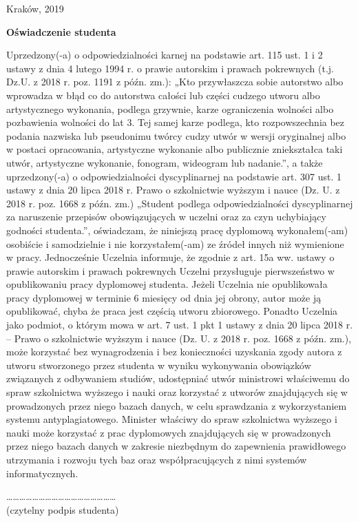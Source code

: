 \documentclass[12pt,a4paper,titlepage]{article}
\begin{document}
\begin{center}
Kraków, 2019
\end{center}
\newpage

\begin{center}
\textbf{Oświadczenie studenta}
\end{center}

Uprzedzony(-a) o odpowiedzialności karnej na podstawie art. 115 ust. 1 i 2 ustawy z dnia
4 lutego 1994 r. o prawie autorskim i prawach pokrewnych (t.j. Dz.U. z 2018 r. poz.
1191 z późn. zm.): „Kto przywłaszcza sobie autorstwo albo wprowadza w błąd co do
autorstwa całości lub części cudzego utworu albo artystycznego wykonania, podlega
grzywnie, karze ograniczenia wolności albo pozbawienia wolności do lat 3. Tej samej
karze podlega, kto rozpowszechnia bez podania nazwiska lub pseudonimu twórcy cudzy
utwór w wersji oryginalnej albo w postaci opracowania, artystyczne wykonanie albo
publicznie zniekształca taki utwór, artystyczne wykonanie, fonogram, wideogram lub
nadanie.”, a także uprzedzony(-a) o odpowiedzialności dyscyplinarnej na podstawie art.
307 ust. 1 ustawy z dnia 20 lipca 2018 r. Prawo o szkolnictwie wyższym i nauce (Dz. U.
z 2018 r. poz. 1668 z późn. zm.) „Student podlega odpowiedzialności dyscyplinarnej za
naruszenie przepisów obowiązujących w uczelni oraz za czyn uchybiający godności
studenta.”, oświadczam, że niniejszą pracę dyplomową wykonałem(-am) osobiście
i samodzielnie i nie korzystałem(-am) ze źródeł innych niż wymienione w pracy.
Jednocześnie Uczelnia informuje, że zgodnie z art. 15a ww. ustawy o prawie autorskim
i prawach pokrewnych Uczelni przysługuje pierwszeństwo w opublikowaniu pracy
dyplomowej studenta. Jeżeli Uczelnia nie opublikowała pracy dyplomowej w terminie
6 miesięcy od dnia jej obrony, autor może ją opublikować, chyba że praca jest częścią
utworu zbiorowego. Ponadto Uczelnia jako podmiot, o którym mowa w art. 7 ust. 1 pkt 1
ustawy z dnia 20 lipca 2018 r. – Prawo o szkolnictwie wyższym i nauce (Dz. U. z 2018 r.
poz. 1668 z późn. zm.), może korzystać bez wynagrodzenia i bez konieczności uzyskania
zgody autora z utworu stworzonego przez studenta w wyniku wykonywania obowiązków
związanych z odbywaniem studiów, udostępniać utwór ministrowi właściwemu do spraw
szkolnictwa wyższego i nauki oraz korzystać z utworów znajdujących się w prowadzonych
przez niego bazach danych, w celu sprawdzania z wykorzystaniem systemu
antyplagiatowego. Minister właściwy do spraw szkolnictwa wyższego i nauki może
korzystać z prac dyplomowych znajdujących się w prowadzonych przez niego bazach
danych w zakresie niezbędnym do zapewnienia prawidłowego utrzymania i rozwoju tych
baz oraz współpracujących z nimi systemów informatycznych.
\\
\begin{flushright}
……………………………………………\\
(czytelny podpis studenta)
\end{flushright}
\newpage
\end{document}
